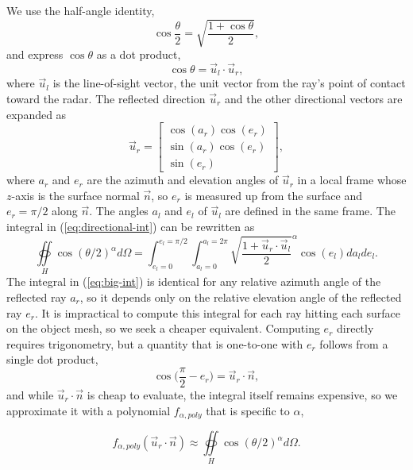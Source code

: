 \documentclass[sensors,article,submit,moreauthors]{Definitions/mdpi}
\begin{document}
We use the half-angle identity,
\begin{equation}
    \cos\frac{\theta}{2} = \sqrt{\frac{1+\cos \theta}{2}}
    ,
\end{equation}
and express $\cos\theta$ as a dot product,
\begin{equation}
    \cos\theta = \vec{u}_{l}\cdot \vec{u}_{r}
    ,
\end{equation}
where $\vec{u}_l$ is the line-of-sight vector, the unit vector from the ray's point of contact toward the radar. The reflected direction $\vec{u}_r$ and the other directional vectors are expanded as 
\begin{equation}
    \vec{u}_r = 
        \begin{bmatrix}
            \cos(a_r)\cos(e_r) \\
            \sin(a_r)\cos(e_r) \\
            \sin(e_r)
        \end{bmatrix}
    ,
\end{equation}
where $a_r$ and $e_r$ are the azimuth and elevation angles of $\vec{u}_r$ in a local frame whose $z$-axis is the surface normal $\vec{n}$, so $e_r$ is measured up from the surface and $e_r = \pi/2$ along $\vec{n}$. The angles $a_l$ and $e_l$ of $\vec{u}_l$ are defined in the same frame. The integral in (\ref{eq:directional-int}) can be rewritten as
\begin{equation}
    \label{eq:big-int}
    \oiint\limits_{H} \cos({\theta/2})^\alpha d \Omega =
    \int_{e_l=0}^{e_l=\pi/2}\int_{a_l=0}^{a_l=2 \pi}\sqrt{\frac{1+\vec{u}_r
    \cdot \vec{u}_l}{2}}^\alpha \cos(e_l) da_lde_l
    .
\end{equation}
The integral in (\ref{eq:big-int}) is identical for any relative azimuth angle of the reflected ray $a_r$, so it depends only on the relative elevation angle of the reflected ray $e_r$. It is impractical to compute this integral for each ray hitting each surface on the object mesh, so we seek a cheaper equivalent. Computing $e_r$ directly requires trigonometry, but a quantity that is one-to-one with $e_r$ follows from a single dot product,
\begin{equation}
    \cos\bigg(\frac{\pi}{2}-e_r\bigg) = \vec{u}_r \cdot \vec{n}
    ,
\end{equation}
and while $\vec{u}_{r} \cdot \vec{n}$ is cheap to evaluate, the integral itself remains expensive, so we approximate it with a polynomial
$f_{\alpha,poly}$ that is specific to $\alpha$,

\begin{equation}
    f_{\alpha,poly}(\vec{u}_{r} \cdot \vec{n}) \approx \oiint\limits_{H}
    \cos({\theta/2})^\alpha d \Omega
    .
\end{equation}
\end{document}
